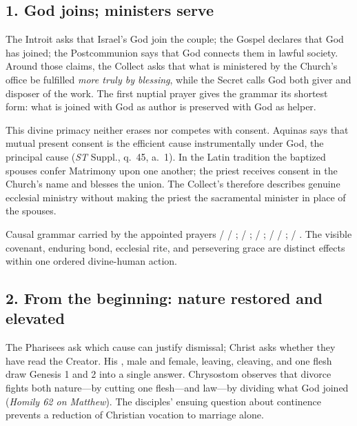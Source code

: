 \begin{deepstudy}
\subsection*{1. God joins; ministers serve\enspace{}}

The Introit asks that Israel's God join the couple; the Gospel declares that God has joined; the Postcommunion says that God connects them in lawful society. Around those claims, the Collect asks that what is ministered by the Church's office be fulfilled \emph{more truly by blessing}, while the Secret calls God both giver and disposer of the work. The first nuptial prayer gives the grammar its shortest form: what is joined with God as author is preserved with God as helper.

This divine primacy neither erases nor competes with consent. Aquinas says that mutual present consent is the efficient cause instrumentally under God, the principal cause (\emph{ST} Suppl., q.~45, a.~1). In the Latin tradition the baptized spouses confer Matrimony upon one another; the priest receives consent in the Church's name and blesses the union. The Collect's  therefore describes genuine ecclesial ministry without making the priest the sacramental minister in place of the spouses.

\begin{sourcecard}{Causal grammar carried by the appointed prayers}
 /  / ;  / ;  / ;  /  / ;  / . The visible covenant, enduring bond, ecclesial rite, and persevering grace are distinct effects within one ordered divine-human action.
\end{sourcecard}

\subsection*{2. From the beginning: nature restored and elevated\enspace{}}

The Pharisees ask which cause can justify dismissal; Christ asks whether they have read the Creator. His , male and female, leaving, cleaving, and one flesh draw Genesis 1 and 2 into a single answer. Chrysostom observes that divorce fights both nature---by cutting one flesh---and law---by dividing what God joined (\emph{Homily 62 on Matthew}). The disciples' ensuing question about continence prevents a reduction of Christian vocation to marriage alone.


\end{deepstudy}
